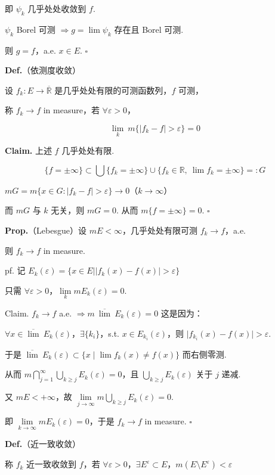 \documentclass[11pt]{ctexart}
\theoremstyle{definition}
\begin{document}
即 $\psi_k$ 几乎处处收敛到 $f$.

$\psi_k$ Borel 可测 $\Rightarrow g = \lim \psi_k$ 存在且 Borel 可测.

则 $g = f$，a.e. $x \in E$. $\square$

\textbf{Def.}（依测度收敛）

设 $f_k: E \to \overline{\mathbb{R}}$ 是几乎处处有限的可测函数列，$f$ 可测，

称 $f_k \to f$ in measure，若 $\forall \varepsilon > 0$，

\[
\lim_k\ m\{\vert f_k - f\vert > \varepsilon\} = 0
\]

\textbf{Claim.} 上述 $f$ 几乎处处有限.

\[
\{f = \pm\infty\} \subset \bigcup \{f_k = \pm\infty\} \cup \{f_k \in \mathbb{R},\ \lim f_k = \pm\infty\} =: G
\]

$mG = m\{x \in G : \vert f_k - f\vert > \varepsilon\} \to 0$（$k \to \infty$）

而 $mG$ 与 $k$ 无关，则 $mG = 0$. 从而 $m\{f = \pm\infty\} = 0$. $\square$

\textbf{Prop.}（Lebesgue）设 $mE < \infty$，几乎处处有限可测 $f_k \to f$，a.e.

则 $f_k \to f$ in measure.

pf. 记 $E_k(\varepsilon) = \{x \in E \mid \vert f_k(x) - f(x)\vert > \varepsilon\}$

只需 $\forall \varepsilon > 0$，$\lim\limits_k mE_k(\varepsilon) = 0$.

Claim. $f_k \to f$ a.e. $\Rightarrow m\ \overline{\lim}\ E_k(\varepsilon) = 0$ 这是因为：

$\forall x \in \overline{\lim}\ E_k(\varepsilon)$，$\exists \{k_i\}$，s.t. $x \in E_{k_i}(\varepsilon)$，则 $\vert f_{k_i}(x) - f(x)\vert > \varepsilon$.

于是 $\overline{\lim}\ E_k(\varepsilon) \subset \{x \mid \lim f_k(x) \neq f(x)\}$ 而右侧零测.

从而 $m \bigcap\limits_{j=1}^{\infty} \bigcup\limits_{k \geq j} E_k(\varepsilon) = 0$，且 $\bigcup\limits_{k \geq j} E_k(\varepsilon)$ 关于 $j$ 递减.

又 $mE < +\infty$，故 $\lim\limits_{j \to \infty} m \bigcup\limits_{k \geq j} E_k(\varepsilon) = 0$.

即 $\lim\limits_{k \to \infty} mE_k(\varepsilon) = 0$，于是 $f_k \to f$ in measure. $\square$

\textbf{Def.}（近一致收敛）

称 $f_k$ 近一致收敛到 $f$，若 $\forall \varepsilon > 0$，$\exists E^\varepsilon \subset E$，$m(E \setminus E^\varepsilon) < \varepsilon$
\end{document}
